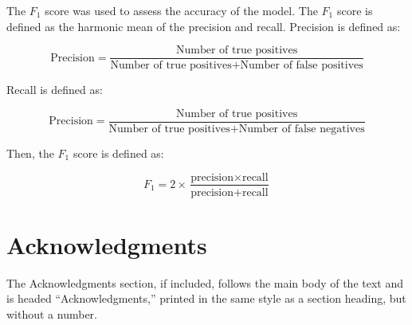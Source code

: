 \documentclass[a4paper,11pt]{article}
\begin{document}
The $F_{1}$ score was used to assess the accuracy of the model. The $F_{1}$ score is defined as the harmonic mean of the precision and recall. Precision is defined as:

\begin{equation}
	\text{Precision} = \frac{ \text{Number of true positives} }{\text{Number of true positives} + \text{Number of false positives}}
\end{equation}

Recall is defined as:

\begin{equation}
	\text{Precision} = \frac{ \text{Number of true positives} }{\text{Number of true positives} + \text{Number of false negatives}}
\end{equation}

Then, the $F_{1}$ score is defined as:

\begin{equation}
	F_{1} = 2 \times \frac{\text{precision} \times \text{recall}}{\text{precision} + \text{recall}}
\end{equation}

\section*{Acknowledgments}

The Acknowledgments section, if included,
		       follows the main body of the text and is headed
		       ``Acknowledgments,'' printed in the same style
		       as a section heading, but without a number.




\end{document}

